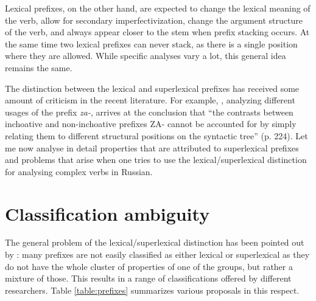 Lexical prefixes, on the other hand, are expected to change the lexical meaning of the verb, allow for secondary imperfectivization, change the argument structure of the verb, and always appear closer to the stem when prefix stacking occurs. At the same time two lexical prefixes can never stack, as there is a single position where they are allowed. While specific analyses vary a lot, this general idea remains the same. 

The distinction between the lexical and superlexical prefixes has received some amount of criticism in the recent literature. For example, \citet{Braginsky:08}, analyzing different usages of the prefix \textit{za-}, arrives at the conclusion that ``the contrasts
between inchoative and non-inchoative prefixes ZA- cannot be accounted for by
simply relating them to different structural positions on the syntactic tree'' (p. 224). Let me now analyse in detail properties that are attributed to superlexical prefixes and problems that arise when one tries to use the lexical/superlexical distinction for analysing complex verbs in Russian.


\section{Classification ambiguity}\label{section:classification}
The general problem of the lexical/superlexical distinction has been pointed out by \citet[32]{Kagan:book}: many prefixes are not easily classified as either lexical or superlexical as they do not have the whole cluster of properties of one of the groups, but rather a mixture of those. This results in a range of classifications offered by different researchers. Table \ref{table:prefixes} summarizes various proposals in this respect.



